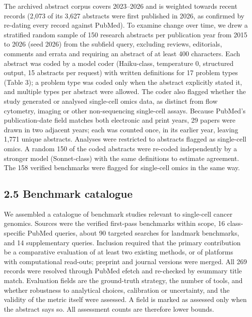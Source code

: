 \documentclass[11pt]{article}
\begin{document}
The archived abstract corpus covers 2023--2026 and is weighted towards
recent records (2,073 of its 3,627 abstracts were first published in
2026, as confirmed by re-dating every record against PubMed). To examine
change over time, we drew a stratified random sample of 150 research
abstracts per publication year from 2015 to 2026 (seed 2026) from the
subfield query, excluding reviews, editorials, comments and errata and
requiring an abstract of at least 400 characters. Each abstract was
coded by a model coder (Haiku-class, temperature 0, structured output,
15 abstracts per request) with written definitions for 17 problem types
(Table 3); a problem type was coded only when the abstract explicitly
stated it, and multiple types per abstract were allowed. The coder also
flagged whether the study generated or analysed single-cell omics data,
as distinct from flow cytometry, imaging or other non-sequencing
single-cell assays. Because PubMed's publication-date field matches both
electronic and print years, 29 papers were drawn in two adjacent years;
each was counted once, in its earlier year, leaving 1,771 unique
abstracts. Analyses were restricted to abstracts flagged as single-cell
omics. A random 150 of the coded abstracts were re-coded independently
by a stronger model (Sonnet-class) with the same definitions to estimate
agreement. The 158 verified benchmarks were flagged for single-cell
omics in the same way.

\subsection{2.5 Benchmark catalogue}\label{benchmark-catalogue}

We assembled a catalogue of benchmark studies relevant to single-cell
cancer genomics. Sources were the verified first-pass benchmarks within
scope, 16 class-specific PubMed queries, about 90 targeted searches for
landmark benchmarks, and 14 supplementary queries. Inclusion required
that the primary contribution be a comparative evaluation of at least
two existing methods, or of platforms with computational read-outs;
preprint and journal versions were merged. All 269 records were resolved
through PubMed efetch and re-checked by esummary title match. Evaluation
fields are the ground-truth strategy, the number of tools, and whether
robustness to analytical choices, calibration or uncertainty, and the
validity of the metric itself were assessed. A field is marked as
assessed only when the abstract says so. All assessment counts are
therefore lower bounds.
\end{document}
